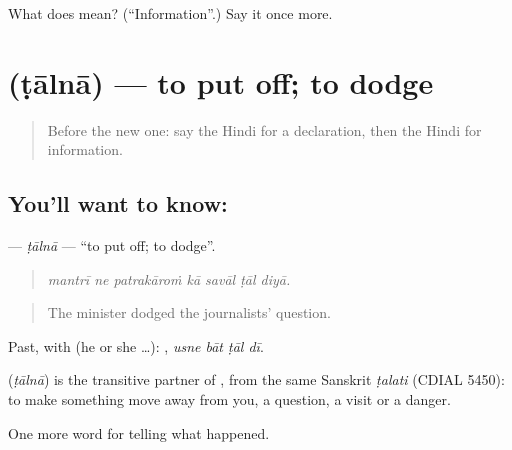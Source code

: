 \begin{tcolorbox}[breakable,colback=teal!4,colframe=teal!35!black,title={Before you move on}]
What does  mean? (\textquotedblleft{}Information\textquotedblright{}.) Say it once more.
\end{tcolorbox}
\section[\texorpdfstring{\hi{टालना} (ṭālnā)}{टालना (ṭālnā)}]{ (ṭālnā) — to put off; to dodge}

\label{lesson:HI-C315-ttaalna}



\begin{quote}
Before the new one: say the Hindi for a declaration, then the Hindi for information.
\end{quote}

\subsection*{You'll want to know: }
\textbf{} — \emph{ṭālnā} — \textquotedblleft{}to put off; to dodge\textquotedblright{}.

\begin{quote}
      
\end{quote}

\begin{quote}
\emph{mantrī ne patrakāroṁ kā savāl ṭāl diyā.}
\end{quote}

\begin{quote}
The minister dodged the journalists' question.
\end{quote}

Past, with  (he or she …):    , \emph{usne bāt ṭāl dī}.

\begin{cousinweb}
\textbf{} (\emph{ṭālnā}) is the transitive partner of \textbf{}, from the same Sanskrit \emph{ṭalati} (CDIAL 5450): to make something move away from you, a question, a visit or a danger.
\end{cousinweb}

\begin{grammarlens}[title={What you've built}]
One more word for telling what happened.
\end{grammarlens}

